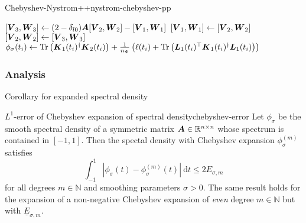 \documentclass[12pt]{article}
\begin{document}
\begin{algo}{Chebyshev-Nystrom++}{nystrom-chebyshev-pp}
\begin{algorithmic}[1]
      \EndFor
      \State $[\boldsymbol{V}_3, \boldsymbol{W}_3] \gets (2 - \delta_{l0}) \boldsymbol{A} [\boldsymbol{V}_2, \boldsymbol{W}_2] - [\boldsymbol{V}_1, \boldsymbol{W}_1]$ 
      \State $[\boldsymbol{V}_1, \boldsymbol{W}_1] \gets [\boldsymbol{V}_2, \boldsymbol{W}_2]$
      \State $[\boldsymbol{V}_2, \boldsymbol{W}_2] \gets [\boldsymbol{V}_3, \boldsymbol{W}_3]$
    \EndFor
      \State $\phi_{\sigma}(t_i) \gets \operatorname{Tr}\left( \boldsymbol{K}_1(t_i)^{\dagger}\boldsymbol{K}_2(t_i) \right) + \frac{1}{n_{\Psi}} \left( \ell(t_i) + \operatorname{Tr}\left( \boldsymbol{L}_1(t_i)^{\top} \boldsymbol{K}_1(t_i)^{\dagger} \boldsymbol{L}_1(t_i) \right)  \right) $ \label{lin:4-nystromchebyshev-nystrom-pp}
    \EndFor
\end{algorithmic}
\end{algo}

\subsubsection{Analysis}
\label{subsubsec:chebyshev-nystrom-analysis}

Corollary for expanded spectral density

\begin{lemma}{$L^1$-error of Chebyshev expansion of spectral density}{chebyshev-error}
    Let $\phi_{\sigma}$ be the smooth spectral density of a symmetric matrix $\boldsymbol{A} \in \mathbb{R}^{n \times n}$ whose spectrum is contained in $[-1, 1]$. Then the spectal density with Chebyshev expansion $\phi_{\sigma}^{(m)}$ satisfies
    \begin{equation}
        \int_{-1}^{1} \left| \phi_{\sigma}(t) - \phi_{\sigma}^{(m)}(t) \right|~\mathrm{d}t \leq 2 E_{\sigma, m}
        \label{equ:chebyshev-interpolation-sup-error-kernel}
    \end{equation}
    for all degrees $m \in \mathbb{N}$ and smoothing parameters $\sigma > 0$. The same result holds for the expansion of a non-negative Chebyshev expansion of \emph{even} degree $m \in \mathbb{N}$ but with $\underline{E}_{\sigma, m}$.
\end{lemma}
\end{document}
